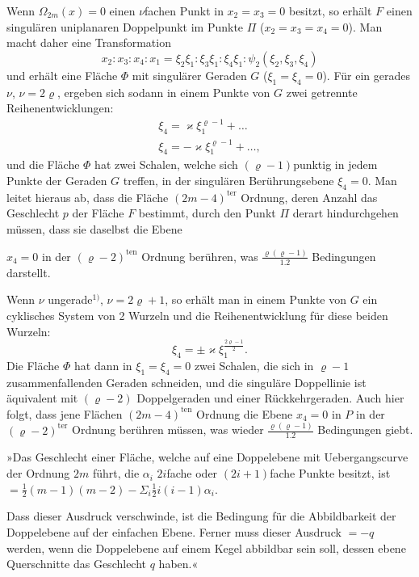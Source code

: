\documentclass{article}
\begin{document}
Wenn $\varOmega_{2m}(x) = 0$ einen $\nu$fachen Punkt in $x_2 = x_3 = 0$ besitzt, so erhält $F$ einen singulären uniplanaren Doppelpunkt im Punkte $\varPi$ ($x_2 = x_3 = x_4 = 0$). Man macht daher eine Transformation
\[ x_2 : x_3 : x_4 : x_1 = \xi_2 \xi_1 : \xi_3 \xi_1 : \xi_4 \xi_1 : \psi_2(\xi_2, \xi_3, \xi_4) \]
und erhält eine Fläche $\varPhi$ mit singulärer Geraden $G$ ($\xi_1 = \xi_4 = 0$). Für ein gerades $\nu$, $\nu = 2\varrho$, ergeben sich sodann in einem Punkte von $G$ zwei getrennte Reihenentwicklungen:
\[
\begin{gathered}
\xi_4 = \varkappa \xi_1^{\varrho-1} + \ldots \\
\xi_4 = -\varkappa \xi_1^{\varrho-1} + \ldots,
\end{gathered}
\]
und die Fläche $\varPhi$ hat zwei Schalen, welche sich $(\varrho-1)$punktig in jedem Punkte der Geraden $G$ treffen, in der singulären Berührungsebene $\xi_4 = 0$. Man leitet hieraus ab, dass die Fläche $(2m-4)^{\text{ter}}$ Ordnung, deren Anzahl das Geschlecht $p$ der Fläche $F$ bestimmt, durch den Punkt $\varPi$ derart hindurchgehen müssen, dass sie daselbst die Ebene

$x_4 = 0$ in der $(\varrho-2)^{\text{ten}}$ Ordnung berühren, was $\frac{\varrho(\varrho-1)}{1.2}$ Bedingungen darstellt.

Wenn $\nu$ ungerade${}^{1)}$, $\nu = 2\varrho+1$, so erhält man in einem Punkte von $G$ ein cyklisches System von 2 Wurzeln und die Reihenentwicklung für diese beiden Wurzeln:
\[ \xi_4 = \pm \varkappa \xi_1^{\frac{2\varrho-1}{2}}. \]
Die Fläche $\varPhi$ hat dann in $\xi_1 = \xi_4 = 0$ zwei Schalen, die sich in $\varrho-1$ zusammenfallenden Geraden schneiden, und die singuläre Doppellinie ist äquivalent mit $(\varrho-2)$ Doppelgeraden und einer Rückkehrgeraden. Auch hier folgt, dass jene Flächen $(2m-4)^{\text{ten}}$ Ordnung die Ebene $x_4 = 0$ in $P$ in der $(\varrho-2)^{\text{ter}}$ Ordnung berühren müssen, was wieder $\frac{\varrho(\varrho-1)}{1.2}$ Bedingungen giebt.

»Das Geschlecht einer Fläche, welche auf eine Doppelebene mit Uebergangscurve der Ordnung $2m$ führt, die $\alpha_i$ $2i$fache oder $(2i+1)$fache Punkte besitzt, ist $=\frac{1}{2}(m-1)(m-2) - \Sigma_i \frac{1}{2} i(i-1)\alpha_i$.

Dass dieser Ausdruck verschwinde, ist die Bedingung für die Abbildbarkeit der Doppelebene auf der einfachen Ebene. Ferner muss dieser Ausdruck $=-q$ werden, wenn die Doppelebene auf einem Kegel abbildbar sein soll, dessen ebene Querschnitte das Geschlecht $q$ haben.«
\end{document}
